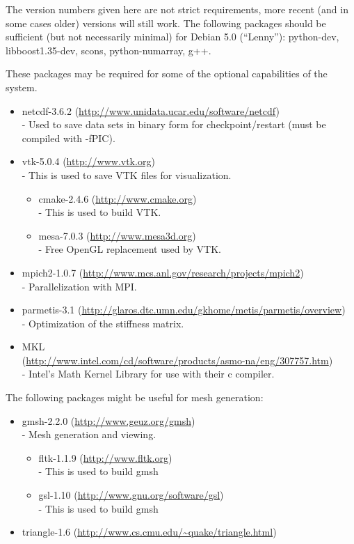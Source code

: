 The version numbers given here are not strict requirements, more recent (and in some cases older) versions will
still work. 
The following packages should be sufficient (but not necessarily minimal) for Debian 5.0 (``Lenny''):
python-dev, libboost1.35-dev, scons, python-numarray, g++.


These packages may be required for some of the optional capabilities of the system.

\begin{itemize}
 \item netcdf-3.6.2 (\url{http://www.unidata.ucar.edu/software/netcdf}) \\-
        Used to save data sets in binary form for checkpoint/restart (must be compiled with -fPIC).
\item vtk-5.0.4 (\url{http://www.vtk.org}) \\-
        This is used to save VTK files for visualization.
  \begin{itemize}
  \item cmake-2.4.6 (\url{http://www.cmake.org}) \\-
        This is used to build VTK.
  \item     mesa-7.0.3 (\url{http://www.mesa3d.org})\\-
        Free OpenGL replacement used by VTK.
  \end{itemize}

\item     mpich2-1.0.7 (\url{http://www.mcs.anl.gov/research/projects/mpich2}) \\-
        Parallelization with MPI.
\item     parmetis-3.1 (\url{http://glaros.dtc.umn.edu/gkhome/metis/parmetis/overview}) \\-
        Optimization of the stiffness matrix.
\item MKL \\(\url{http://www.intel.com/cd/software/products/asmo-na/eng/307757.htm}) \\-
        Intel's Math Kernel Library for use with their c compiler.
\end{itemize}

The following packages might be useful for mesh generation:
\begin{itemize}
 \item gmsh-2.2.0 (\url{http://www.geuz.org/gmsh}) \\-
    Mesh generation and viewing.
  \begin{itemize}
 \item fltk-1.1.9 (\url{http://www.fltk.org}) \\-
    This is used to build gmsh 
\item gsl-1.10 (\url{http://www.gnu.org/software/gsl}) \\-
    This is used to build gmsh 
\end{itemize}

\item triangle-1.6 (\url{http://www.cs.cmu.edu/~quake/triangle.html}) 
\end{itemize}

